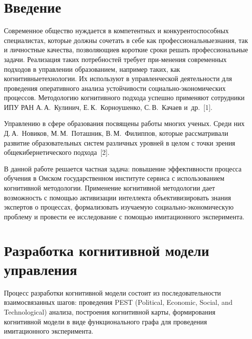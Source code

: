       \begin{multicols}{2}

            \label{st\stat}     
  
  
\section{Введение}

    Современное общество нуждается в компетентных и 
конкурентоспособных специалистах, которые должны сочетать в себе как 
профессиональные\linebreak знания, так и личностные качества, позволяющие\linebreak в 
короткие сроки решать профессиональные задачи. Реализация таких 
потребностей требует при-\linebreak менения современных подходов в управлении 
об\-разованием, например таких, как когнитивные\linebreak технологии. Их используют 
в управленческой деятельности для проведения оперативного анализа 
устой\-чи\-вости со\-ци\-аль\-но-эко\-но\-ми\-че\-ских процессов. Методологию 
когнитивного подхода успешно применяют сотрудники ИПУ РАН 
А.\,А.~Кулинич, Е.\,К.~Корноушенко, С.\,В.~Качаев и~др.~[1]. 
    
    Управлению в сфере образования посвящены работы многих ученых. 
Среди них Д.\,А.~Новиков, М.\,М.~Поташник, В.\,М.~Филиппов, которые 
рассматривали развитие образовательных систем различных уровней в целом 
с точки зрения общекибернетического подхода~[2]. 
    
    В данной работе решается частная задача: повышение эффективности 
процесса обучения в \mbox{Омском} государственном институте сервиса с 
использованием когнитивной методологии. Применение когнитивной 
методологии дает возможность с помощью активизации интеллекта 
объективизировать знания экспертов о процессах, формализовать изучаемую 
социально-экономическую проб\-ле\-му и провести ее исследование с помощью 
имитационного эксперимента. 
    
\section{Разработка когнитивной модели управления}
    
    Процесс разработки когнитивной модели состоит из последовательности 
взаимосвязанных шагов: проведения PEST (Political, Economic, Social, and Technological)
ана\-ли\-за, построения 
когнитивной карты, формирования когнитивной модели в виде 
функционального графа для проведения имитационного эксперимента. 
    

\end{multicols}
